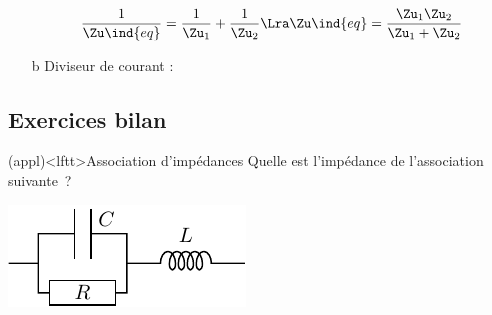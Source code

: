 \documentclass[../../main/main.tex]{subfiles}
\begin{document}
\begin{tcb}[tabularx={l|Y|Y}]
\begin{itemize}
{\begin{gather*}
				      \frac{1}{\Zu\ind{eq}} = \frac{1}{\Zu_1} + \frac{1}{\Zu_2}
				      \Lra
				      \Zu\ind{eq} = \frac{\Zu_1\Zu_2}{\Zu_1+\Zu_2}
			      \end{gather*}
		      }%
		      \vspace{-15pt}
		\item[b]{Diviseur de courant} :
		      \vspace{-30pt}
	\end{itemize}
\end{tcb}

\subsection{Exercices bilan}
\begin{tcb}[sidebyside, righthand ratio=.7](appl)<lftt>{Association d'impédances}
	Quelle est l'impédance de l'association suivante~?
	\begin{center}
		\includegraphics[width=\linewidth]{exo_zeq}
	\end{center}
	\tcblower
	\vspace{-15pt}
\end{tcb}
\end{document}
